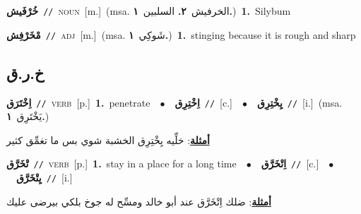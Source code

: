 \documentclass[10pt,a4paper,twoside]{article} %
\begin{document}
\begin{multicols}{2}
{\setlength\topsep{0pt}\textbf{\foreignlanguage{arabic}{خُرْفَيش}}\ {\color{gray}\texttt{//}\color{black}}\ \textsc{noun}\ [m.]\ \color{gray}(msa. \foreignlanguage{arabic}{الخرفيش}~\foreignlanguage{arabic}{\textbf{٢.}}  \foreignlanguage{arabic}{السلبين}~\foreignlanguage{arabic}{\textbf{١.}})\color{black}\ \textbf{1.}~Silybum\ } \vspace{2mm}

{\setlength\topsep{0pt}\textbf{\foreignlanguage{arabic}{مْخَرْفِش}}\ {\color{gray}\texttt{//}\color{black}}\ \textsc{adj}\ [m.]\ \color{gray}(msa. \foreignlanguage{arabic}{شَوكِي}~\foreignlanguage{arabic}{\textbf{١.}})\color{black}\ \textbf{1.}~stinging because it is rough and sharp\ } \vspace{2mm}

\vspace{-3mm}
\subsection*{\color{blue}\foreignlanguage{arabic}{خ.ر.ق}\color{blue}{}} 

{\setlength\topsep{0pt}\textbf{\foreignlanguage{arabic}{اِخْتَرَق}}\ {\color{gray}\texttt{//}\color{black}}\ \textsc{verb}\ [p.]\ \textbf{1.}~penetrate\ \ $\bullet$\ \ \setlength\topsep{0pt}\textbf{\foreignlanguage{arabic}{اِخْتِرِق}}\ {\color{gray}\texttt{//}\color{black}}\ [c.]\ \ $\bullet$\ \ \setlength\topsep{0pt}\textbf{\foreignlanguage{arabic}{يِخْتِرِق}}\ {\color{gray}\texttt{//}\color{black}}\ [i.]\ \color{gray}(msa. \foreignlanguage{arabic}{يَخْتَرِق}~\foreignlanguage{arabic}{\textbf{١.}})\color{black}\  \begin{flushright}\color{gray}\foreignlanguage{arabic}{\textbf{\underline{\foreignlanguage{arabic}{أمثلة}}}: خلِّيه يِخْتِرِق الخشبة شوي بس ما تغمِّق كثير}\end{flushright}\color{black}} \vspace{2mm}

{\setlength\topsep{0pt}\textbf{\foreignlanguage{arabic}{تْخَرَّق}}\ {\color{gray}\texttt{//}\color{black}}\ \textsc{verb}\ [p.]\ \textbf{1.}~stay in a place for a long time\ \ $\bullet$\ \ \setlength\topsep{0pt}\textbf{\foreignlanguage{arabic}{اِتْخَرَّق}}\ {\color{gray}\texttt{//}\color{black}}\ [c.]\ \ $\bullet$\ \ \setlength\topsep{0pt}\textbf{\foreignlanguage{arabic}{يِتْخَرَّق}}\ {\color{gray}\texttt{//}\color{black}}\ [i.]\  \begin{flushright}\color{gray}\foreignlanguage{arabic}{\textbf{\underline{\foreignlanguage{arabic}{أمثلة}}}: ضلك اِتْخَرَّق عند أبو خالد ومسِّح له جوخ بلكي بيرضى عليك}\end{flushright}\color{black}} \vspace{2mm}


\end{multicols}
\end{document}
